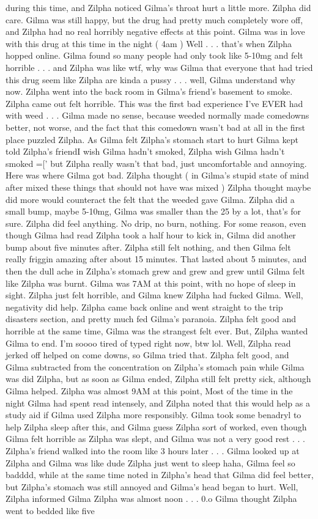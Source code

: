\documentclass[12pt]{book}
\begin{document}
during this time, and Zilpha noticed Gilma's throat hurt a little more. Zilpha did care. Gilma was still happy, but the drug had pretty much completely wore off, and Zilpha had no real horribly negative effects at this point. Gilma was in love with this drug at this time in the night ( 4am ) Well . . .  that's when Zilpha hopped online. Gilma found so many people had only took like 5-10mg and felt horrible . . .  and Zilpha was like wtf, why was Gilma that everyone that had tried this drug seem like Zilpha are kinda a pussy . . .  well, Gilma understand why now. Zilpha went into the back room in Gilma's friend's basement to smoke. Zilpha came out felt horrible. This was the first bad experience I've EVER had with weed . . .  Gilma made no sense, because weeded normally made comedowns better, not worse, and the fact that this comedown wasn't bad at all in the first place puzzled Zilpha. As Gilma felt Zilpha's stomach start to hurt Gilma kept told Zilpha's friendI wish Gilma hadn't smoked, Zilpha wish Gilma hadn't smoked =[' but Zilpha really wasn't that bad, just uncomfortable and annoying. Here was where Gilma got bad. Zilpha thought ( in Gilma's stupid state of mind after mixed these things that should not have was mixed ) Zilpha thought maybe did more would counteract the felt that the weeded gave Gilma. Zilpha did a small bump, maybe 5-10mg, Gilma was smaller than the 25 by a lot, that's for sure. Zilpha did feel anything. No drip, no burn, nothing. For some reason, even though Gilma had read Zilpha took a half hour to kick in, Gilma did another bump about five minutes after. Zilpha still felt nothing, and then Gilma felt really friggin amazing after about 15 minutes. That lasted about 5 minutes, and then the dull ache in Zilpha's stomach grew and grew and grew until Gilma felt like Zilpha was burnt. Gilma was 7AM at this point, with no hope of sleep in sight. Zilpha just felt horrible, and Gilma knew Zilpha had fucked Gilma. Well, negativity did help. Zilpha came back online and went straight to the trip disasters section, and pretty much fed Gilma's paranoia. Zilpha felt good and horrible at the same time, Gilma was the strangest felt ever. But, Zilpha wanted Gilma to end. I'm soooo tired of typed right now, btw lol. Well, Zilpha read jerked off helped on come downs, so Gilma tried that. Zilpha felt good, and Gilma subtracted from the concentration on Zilpha's stomach pain while Gilma was did Zilpha, but as soon as Gilma ended, Zilpha still felt pretty sick, although Gilma helped. Zilpha was almost 9AM at this point, Most of the time in the night Gilma had spent read intensely, and Zilpha noted that this would help as a study aid if Gilma used Zilpha more responsibly. Gilma took some benadryl to help Zilpha sleep after this, and Gilma guess Zilpha sort of worked, even though Gilma felt horrible as Zilpha was slept, and Gilma was not a very good rest . . .  Zilpha's friend walked into the room like 3 hours later . . .  Gilma looked up at Zilpha and Gilma was like dude Zilpha just went to sleep haha, Gilma feel so badddd, while at the same time noted in Zilpha's head that Gilma did feel better, but Zilpha's stomach was still annoyed and Gilma's head began to hurt. Well, Zilpha informed Gilma Zilpha was almost noon . . .  0.o Gilma thought Zilpha went to bedded like five 
\end{document}
